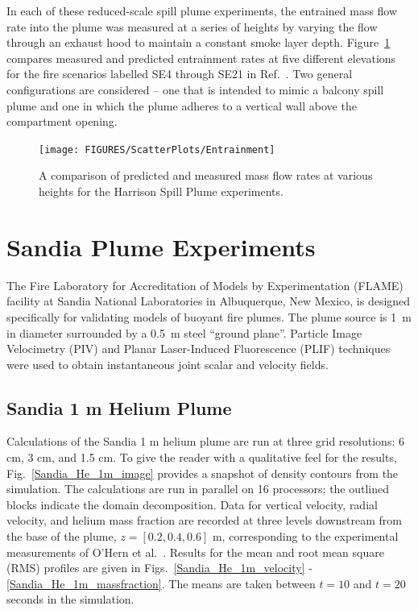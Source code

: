 In each of these reduced-scale spill plume experiments, the entrained mass flow rate into the plume was measured at a series of heights by varying the flow through an exhaust hood to maintain a constant smoke layer depth.  Figure~\ref{Entrainment} compares measured and predicted entrainment rates at five different elevations for the fire scenarios labelled SE4 through SE21 in Ref.~\cite{Harrison:2009}. Two general configurations are considered -- one that is intended to mimic a balcony spill plume and one in which the plume adheres to a vertical wall above the compartment opening.

\begin{figure}[h]
\begin{center}
\texttt{[image: FIGURES/ScatterPlots/Entrainment]}
\caption[Summary of plume entrainment predictions]{A comparison of predicted and measured mass flow rates at various heights for the Harrison Spill Plume experiments.}
\label{Entrainment}
\end{center}
\end{figure}




\clearpage

\section{Sandia Plume Experiments}

The Fire Laboratory for Accreditation of Models by Experimentation (FLAME) facility \cite{OHern:2005,Blanchat:2001} at Sandia National Laboratories in Albuquerque, New Mexico, is designed specifically for validating models of buoyant fire plumes.  The plume source is 1~m in diameter surrounded by a 0.5~m steel ``ground plane''. Particle Image Velocimetry (PIV) and Planar Laser-Induced Fluorescence (PLIF) techniques were used to obtain instantaneous joint scalar and velocity fields.

\subsection{Sandia 1 m Helium Plume}
\label{Sandia plume}

Calculations of the Sandia 1 m helium plume are run at three grid resolutions: 6 cm, 3 cm, and 1.5 cm.  To give the reader with a qualitative feel for the results, Fig.~\ref{Sandia_He_1m_image} provides a snapshot of density contours from the simulation. The calculations are run in parallel on 16 processors; the outlined blocks indicate the domain decomposition.  Data for vertical velocity, radial velocity, and helium mass fraction are recorded at three levels downstream from the base of the plume, $z = [0.2, 0.4, 0.6]$ m, corresponding to the experimental measurements of O'Hern et al.~\cite{OHern:2005}.  Results for the mean and root mean square (RMS) profiles are given in Figs.~\ref{Sandia_He_1m_velocity} - \ref{Sandia_He_1m_massfraction}.  The means are taken between $t=10$ and $t=20$ seconds in the simulation.


